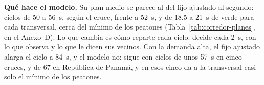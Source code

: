 \begin{table}[!tbp]
\centering
\footnotesize
\setlength{\tabcolsep}{3pt}

\caption[Caso Lima, el corredor: qué aportan los mensajes]{Caso Lima, el corredor: qué aportan los mensajes entre cruces vecinos, con dos pruebas por demanda. Retraso total en las dos tandas, de 100 semillas cada una; un cambio negativo es menos retraso con mensajes.}
\label{tab:corredor-mensajes}
\end{table}

\noindent\textbf{Qué hace el modelo.} Su plan medio se parece al del
fijo ajustado al segundo: ciclos de 50 a 56~s, según el cruce, frente a
52~s, y de 18.5 a 21~s de verde para cada transversal, cerca del mínimo
de los peatones (Tabla~\ref{tab:corredor-planes}, en el Anexo~D). Lo
que cambia es cómo reparte cada ciclo: decide cada 2~s, con lo que
observa y lo que le dicen sus vecinos. Con la demanda alta, el fijo
ajustado alarga el ciclo a 84~s, y el modelo no: sigue con ciclos de
unos 57~s en cinco cruces, y de 67 en República de Panamá, y en esos
cinco da a la transversal casi solo el mínimo de los peatones.

